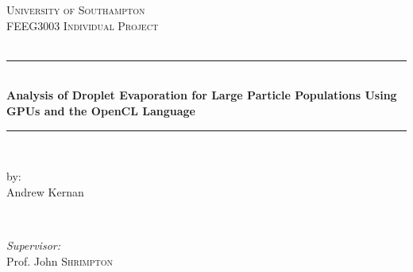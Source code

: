 \documentclass[../Interim_Report_Master]{subfiles}
\begin{document}
\begin{titlepage}

\newcommand{\HRule}{\rule{\linewidth}{0.5mm}} %

\center %
 

\textsc{\LARGE University of Southampton}\\[1.5cm] %
\textsc{\Large FEEG3003 Individual Project}\\[0.5cm] %
\textsc{\large }\\[0.5cm] %


\HRule \\[0.4cm]
{ \huge \bfseries Analysis of Droplet Evaporation for Large Particle Populations Using GPUs and the OpenCL Language}\\[0.4cm] %
\HRule \\[1.5cm]
 

\begin{minipage}{0.4\textwidth}
\begin{flushleft} \large
by:\\
Andrew Kernan %
\end{flushleft}
\end{minipage}
~
\begin{minipage}{0.4\textwidth}
\begin{flushright} \large
\emph{Supervisor:} \\
Prof. John \textsc{Shrimpton} %
\end{flushright}
\end{minipage}\\[2cm]



\end{titlepage}
\end{document}
